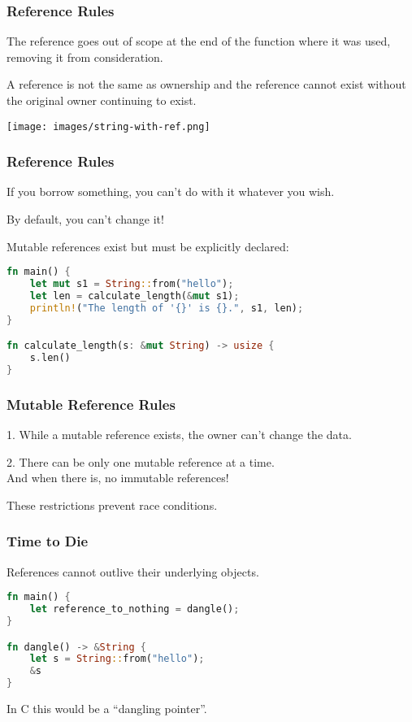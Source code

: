 \begin{frame}
\frametitle{Reference Rules}

The reference goes out of scope at the end of the function where it was used, removing it from consideration. 

A reference is not the same as ownership and the reference cannot exist without the original owner continuing to exist. 

\begin{center}
\texttt{[image: images/string-with-ref.png]}
\end{center}

\end{frame}


\begin{frame}[fragile]
\frametitle{Reference Rules}

If you borrow something, you can't do with it whatever you wish.

By default, you can't change it! 

Mutable references exist but must be explicitly declared:

\begin{lstlisting}[language=Rust]
fn main() {
    let mut s1 = String::from("hello");
    let len = calculate_length(&mut s1);
    println!("The length of '{}' is {}.", s1, len);
}

fn calculate_length(s: &mut String) -> usize {
    s.len()
}
\end{lstlisting}


\end{frame}


\begin{frame}
\frametitle{Mutable Reference Rules}

1. While a mutable reference exists, the owner can't change the data.

2. There can be only one mutable reference at a time.\\
\quad And when there is, no immutable references!

These restrictions prevent race conditions.

\end{frame}


\begin{frame}[fragile]
\frametitle{Time to Die}

References cannot outlive their underlying objects.

\begin{lstlisting}[language=Rust]
fn main() {
    let reference_to_nothing = dangle();
}

fn dangle() -> &String {
    let s = String::from("hello");
    &s
}
\end{lstlisting} 

In C this would be a ``dangling pointer''.

\end{frame}


